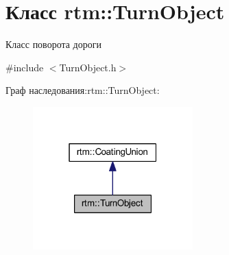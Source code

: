 \hypertarget{classrtm_1_1_turn_object}{}\section{Класс rtm\+:\+:Turn\+Object}
\label{classrtm_1_1_turn_object}


Класс поворота дороги  




{\ttfamily \#include $<$Turn\+Object.\+h$>$}



Граф наследования\+:rtm\+:\+:Turn\+Object\+:
\nopagebreak
\begin{figure}[H]
\begin{center}
\leavevmode
\includegraphics[width=175pt]{classrtm_1_1_turn_object__inherit__graph}
\end{center}
\end{figure}
